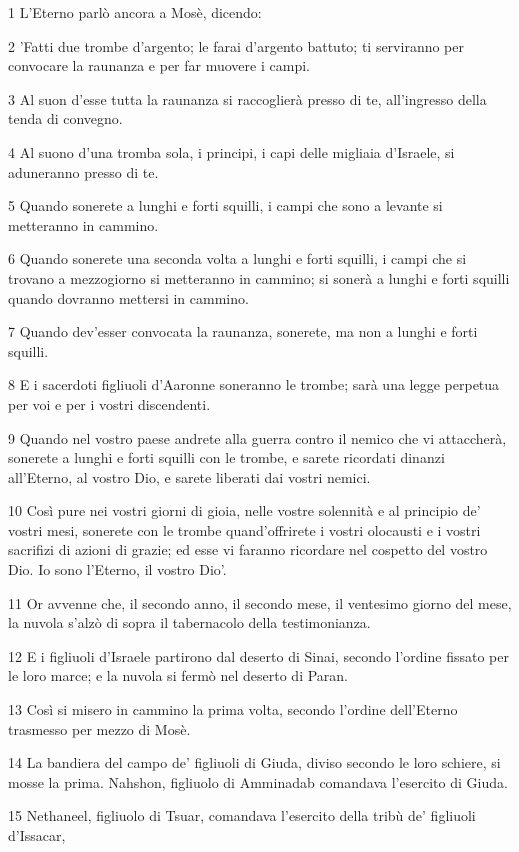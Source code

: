 \par 1 L'Eterno parlò ancora a Mosè, dicendo:
\par 2 'Fatti due trombe d'argento; le farai d'argento battuto; ti serviranno per convocare la raunanza e per far muovere i campi.
\par 3 Al suon d'esse tutta la raunanza si raccoglierà presso di te, all'ingresso della tenda di convegno.
\par 4 Al suono d'una tromba sola, i principi, i capi delle migliaia d'Israele, si aduneranno presso di te.
\par 5 Quando sonerete a lunghi e forti squilli, i campi che sono a levante si metteranno in cammino.
\par 6 Quando sonerete una seconda volta a lunghi e forti squilli, i campi che si trovano a mezzogiorno si metteranno in cammino; si sonerà a lunghi e forti squilli quando dovranno mettersi in cammino.
\par 7 Quando dev'esser convocata la raunanza, sonerete, ma non a lunghi e forti squilli.
\par 8 E i sacerdoti figliuoli d'Aaronne soneranno le trombe; sarà una legge perpetua per voi e per i vostri discendenti.
\par 9 Quando nel vostro paese andrete alla guerra contro il nemico che vi attaccherà, sonerete a lunghi e forti squilli con le trombe, e sarete ricordati dinanzi all'Eterno, al vostro Dio, e sarete liberati dai vostri nemici.
\par 10 Così pure nei vostri giorni di gioia, nelle vostre solennità e al principio de' vostri mesi, sonerete con le trombe quand'offrirete i vostri olocausti e i vostri sacrifizi di azioni di grazie; ed esse vi faranno ricordare nel cospetto del vostro Dio. Io sono l'Eterno, il vostro Dio'.
\par 11 Or avvenne che, il secondo anno, il secondo mese, il ventesimo giorno del mese, la nuvola s'alzò di sopra il tabernacolo della testimonianza.
\par 12 E i figliuoli d'Israele partirono dal deserto di Sinai, secondo l'ordine fissato per le loro marce; e la nuvola si fermò nel deserto di Paran.
\par 13 Così si misero in cammino la prima volta, secondo l'ordine dell'Eterno trasmesso per mezzo di Mosè.
\par 14 La bandiera del campo de' figliuoli di Giuda, diviso secondo le loro schiere, si mosse la prima. Nahshon, figliuolo di Amminadab comandava l'esercito di Giuda.
\par 15 Nethaneel, figliuolo di Tsuar, comandava l'esercito della tribù de' figliuoli d'Issacar,
